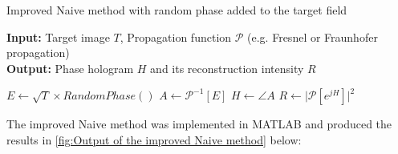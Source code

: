 \begin{algorithm}[H]
  \caption{Improved Naive method with random phase added to the target field}\label{alg:Naive algorithm with random phase}
  \textbf{Input:} Target image $T$, Propagation function $\mathcal{P}$ (e.g. Fresnel or Fraunhofer propagation)\\
  \textbf{Output:} Phase hologram $H$ and its reconstruction intensity $R$
  \begin{algorithmic}
    \State $E \gets \sqrt{T} \times RandomPhase()$
    \State $A \gets \mathcal{P}^{-1}[E]$
    \State $H \gets \angle A$
    \State $R \gets \vert \mathcal{P}[e^{jH}] \vert ^2 $
  \end{algorithmic}
\end{algorithm}

The improved Naive method was implemented in MATLAB and produced the results in \cref{fig:Output of the improved Naive method} below:

